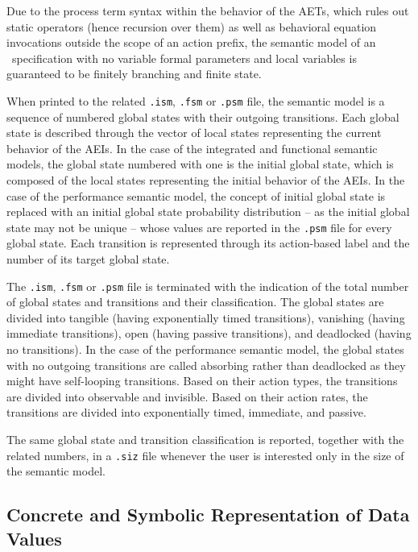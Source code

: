 Due to the process term syntax within the behavior of the AETs, which rules out static operators (hence
recursion over them) as well as behavioral equation invocations outside the scope of an action prefix, the
semantic model of an \aemilia\ specification with no variable formal parameters and local variables is
guaranteed to be finitely branching and finite state.

When printed to the related {\tt .ism}, {\tt .fsm} or {\tt .psm} file, the semantic model is a sequence of
numbered global states with their outgoing transitions. Each global state is described through the vector of
local states representing the current behavior of the AEIs. In the case of the integrated and functional
semantic models, the global state numbered with one is the initial global state, which is composed of the
local states representing the initial behavior of the AEIs. In the case of the performance semantic model,
the concept of initial global state is replaced with an initial global state probability distribution -- as
the initial global state may not be unique -- whose values are reported in the {\tt .psm} file for every
global state. Each transition is represented through its action-based label and the number of its target
global state.

The {\tt .ism}, {\tt .fsm} or {\tt .psm} file is terminated with the indication of the total number of
global states and transitions and their classification. The global states are divided into tangible (having
exponentially timed transitions), vanishing (having immediate transitions), open (having passive
transitions), and deadlocked (having no transitions). In the case of the performance semantic model, the
global states with no outgoing transitions are called absorbing rather than deadlocked as they might have
self-looping transitions. Based on their action types, the transitions are divided into observable and
invisible. Based on their action rates, the transitions are divided into exponentially timed, immediate, and
passive.

The same global state and transition classification is reported, together with the related numbers, in a
{\tt .siz} file whenever the user is interested only in the size of the semantic model.


\subsection{Concrete and Symbolic Representation of Data Values}

